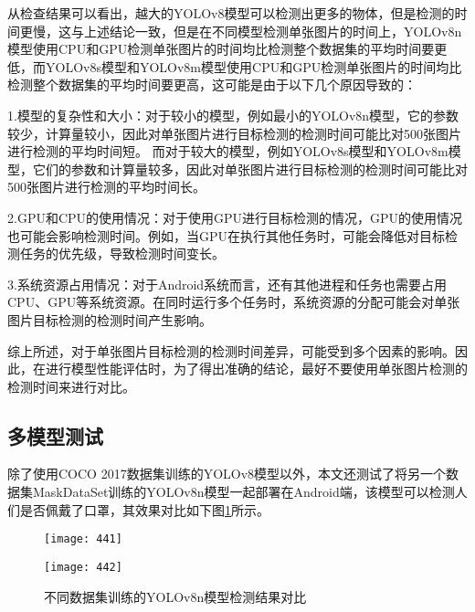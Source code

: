 \documentclass{ctexart}
\numberwithin{equation}{section}%
\numberwithin{figure}{section}%
\numberwithin{table}{section}%
\begin{document}
	从检查结果可以看出，越大的YOLOv8模型可以检测出更多的物体，但是检测的时间更慢，这与上述结论一致，但是在不同模型检测单张图片的时间上，YOLOv8n模型使用CPU和GPU检测单张图片的时间均比检测整个数据集的平均时间要更低，而YOLOv8s模型和YOLOv8m模型使用CPU和GPU检测单张图片的时间均比检测整个数据集的平均时间要更高，这可能是由于以下几个原因导致的：
	
	1.模型的复杂性和大小：对于较小的模型，例如最小的YOLOv8n模型，它的参数较少，计算量较小，因此对单张图片进行目标检测的检测时间可能比对500张图片进行检测的平均时间短。%
	而对于较大的模型，例如YOLOv8s模型和YOLOv8m模型，它们的参数和计算量较多，因此对单张图片进行目标检测的检测时间可能比对500张图片进行检测的平均时间长。%

	2.GPU和CPU的使用情况：对于使用GPU进行目标检测的情况，GPU的使用情况也可能会影响检测时间。例如，当GPU在执行其他任务时，可能会降低对目标检测任务的优先级，导致检测时间变长。%
	
	
	3.系统资源占用情况：对于Android系统而言，还有其他进程和任务也需要占用CPU、GPU等系统资源。在同时运行多个任务时，系统资源的分配可能会对单张图片目标检测的检测时间产生影响。
	
	综上所述，对于单张图片目标检测的检测时间差异，可能受到多个因素的影响。因此，在进行模型性能评估时，为了得出准确的结论，最好不要使用单张图片检测的检测时间来进行对比。
	
	\subsection{多模型测试}
	除了使用COCO 2017数据集训练的YOLOv8模型以外，本文还测试了将另一个数据集MaskDataSet训练的YOLOv8n模型一起部署在Android端，该模型可以检测人们是否佩戴了口罩，其效果对比如下图\ref{t441}所示。
	
	\begin{figure}[h]
		\centering
		\begin{minipage}{0.35\linewidth}
			\centering
			\texttt{[image: 441]}
		\end{minipage}
		\begin{minipage}{0.35\linewidth}
			\centering
			\texttt{[image: 442]}
		\end{minipage}
		\caption{不同数据集训练的YOLOv8n模型检测结果对比}
		\label{t441}%
	\end{figure}
\end{document}
